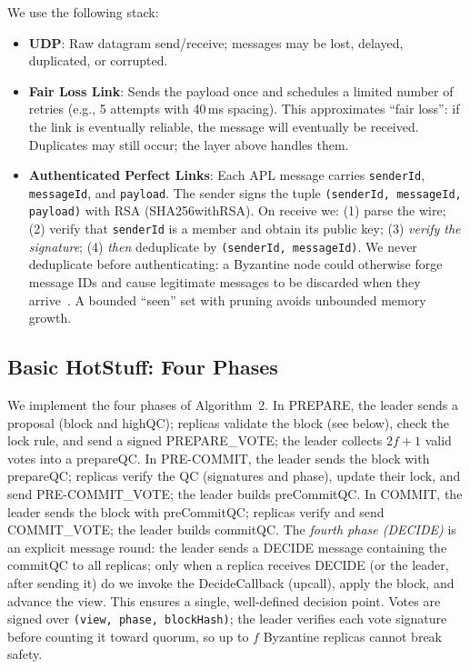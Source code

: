 \documentclass{llncs}
\begin{document}
We use the following stack:
\begin{itemize}
  \setlength{\itemsep}{1pt}\setlength{\parsep}{0pt}\setlength{\topsep}{2pt}
  \item \textbf{UDP}: Raw datagram send/receive; messages may be lost, delayed, duplicated, or corrupted.
  \item \textbf{Fair Loss Link}: Sends the payload once and schedules a limited number of retries (e.g., 5 attempts with 40\,ms spacing). This approximates ``fair loss'': if the link is eventually reliable, the message will eventually be received. Duplicates may still occur; the layer above handles them.
  \item \textbf{Authenticated Perfect Links}: Each APL message carries \texttt{senderId}, \texttt{messageId}, and \texttt{payload}. The sender signs the tuple \texttt{(senderId, messageId, payload)} with RSA (SHA256withRSA). On receive we: (1) parse the wire; (2) verify that \texttt{senderId} is a member and obtain its public key; (3) \emph{verify the signature}; (4) \emph{then} deduplicate by \texttt{(senderId, messageId)}. We never deduplicate before authenticating: a Byzantine node could otherwise forge message IDs and cause legitimate messages to be discarded when they arrive~\cite{hotstuff}. A bounded ``seen'' set with pruning avoids unbounded memory growth.
\end{itemize}

\subsection{Basic HotStuff: Four Phases}

We implement the four phases of Algorithm~2. In PREPARE, the leader sends a proposal (block and highQC); replicas validate the block (see below), check the lock rule, and send a signed PREPARE\_VOTE; the leader collects $2f+1$ valid votes into a prepareQC. In PRE-COMMIT, the leader sends the block with prepareQC; replicas verify the QC (signatures and phase), update their lock, and send PRE-COMMIT\_VOTE; the leader builds preCommitQC. In COMMIT, the leader sends the block with preCommitQC; replicas verify and send COMMIT\_VOTE; the leader builds commitQC. The \emph{fourth phase (DECIDE)} is an explicit message round: the leader sends a DECIDE message containing the commitQC to all replicas; only when a replica receives DECIDE (or the leader, after sending it) do we invoke the DecideCallback (upcall), apply the block, and advance the view. This ensures a single, well-defined decision point. Votes are signed over \texttt{(view, phase, blockHash)}; the leader verifies each vote signature before counting it toward quorum, so up to $f$ Byzantine replicas cannot break safety.
\end{document}

